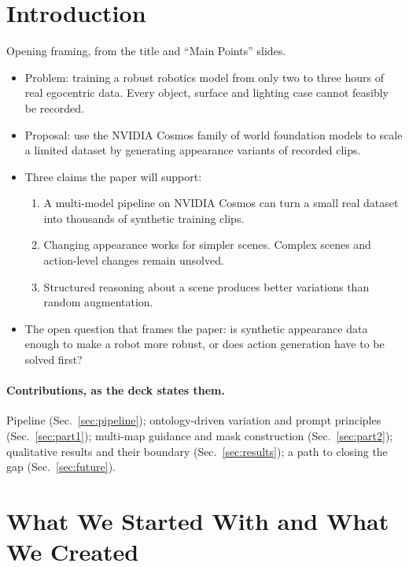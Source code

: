 ﻿%
\section{Introduction}

Opening framing, from the title and ``Main Points'' slides.

\begin{itemize}
    \item Problem: training a robust robotics model from only two to three hours of real egocentric data. Every object, surface and lighting case cannot feasibly be recorded.
    \item Proposal: use the NVIDIA Cosmos family of world foundation models to scale a limited dataset by generating appearance variants of recorded clips.
    \item Three claims the paper will support:
    \begin{enumerate}
        \item A multi-model pipeline on NVIDIA Cosmos can turn a small real dataset into thousands of synthetic training clips.
        \item Changing appearance works for simpler scenes. Complex scenes and action-level changes remain unsolved.
        \item Structured reasoning about a scene produces better variations than random augmentation.
    \end{enumerate}
    \item The open question that frames the paper: is synthetic appearance data enough to make a robot more robust, or does action generation have to be solved first?
\end{itemize}

\paragraph{Contributions, as the deck states them.} Pipeline (Sec.~\ref{sec:pipeline}); ontology-driven variation and prompt principles (Sec.~\ref{sec:part1}); multi-map guidance and mask construction (Sec.~\ref{sec:part2}); qualitative results and their boundary (Sec.~\ref{sec:results}); a path to closing the gap (Sec.~\ref{sec:future}).

\section{What We Started With and What We Created}
\label{sec:startend}

